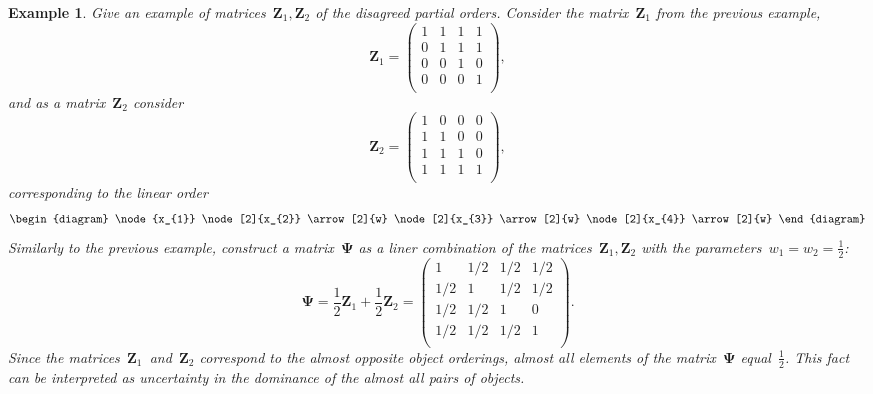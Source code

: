 \documentclass[12pt,preprint]{elsarticle}
\newcommand{\bZ}{\mathbf{Z}}
\newcommand{\bPsi}{\boldsymbol{\Psi}}
\newtheorem{Ex}{Example}
\begin{document}
\begin{Ex} Give an example of matrices~$\bZ_1,\bZ_2$ of the disagreed partial orders. Consider the matrix~$\bZ_1$ from the previous example,
\[
\bZ_1=
\begin{pmatrix}
1 & 1 & 1 & 1 \\
0 & 1 & 1 & 1 \\
0 & 0 & 1 & 0 \\
0 & 0 & 0 & 1 \\
\end{pmatrix},
\]
and as a matrix~$\bZ_2$ consider
\[
\bZ_2=
\begin{pmatrix}
1 & 0 & 0 & 0 \\
1 & 1 & 0 & 0 \\
1 & 1 & 1 & 0 \\
1 & 1 & 1 & 1 \\
\end{pmatrix},
\]
corresponding to the linear order
\[
\begin{diagram}
\node{x_{1}}
\node[2]{x_{2}} \arrow[2]{w}
\node[2]{x_{3}} \arrow[2]{w}
\node[2]{x_{4}} \arrow[2]{w}
\end{diagram}
\]
Similarly to the previous example, construct a matrix~$\bPsi$ as a liner combination of the matrices~$\bZ_1,\bZ_2$ with the parameters~$w_1=w_2=\frac{1}{2}$:
\[
\bPsi=\frac{1}{2}\bZ_1+\frac{1}{2}\bZ_2=
\begin{pmatrix}
1 & 1/2 & 1/2 & 1/2 \\
1/2 & 1 & 1/2 & 1/2 \\
1/2 & 1/2 & 1 & 0 \\
1/2 & 1/2 & 1/2 & 1 \\
\end{pmatrix}.
\]
Since the matrices~$\bZ_1$~and~$\bZ_2$ correspond to the almost opposite object orderings, almost all elements of the matrix~$\bPsi$ equal~$\frac{1}{2}$. This fact can be interpreted as uncertainty in the dominance of the almost all pairs of objects.
\end{Ex}
\end{document}
